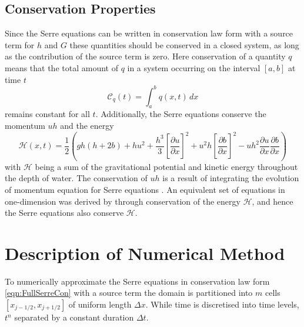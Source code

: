 \documentclass[AMA,STIX1COL]{WileyNJD-v2}
\begin{document}
\subsection{Conservation Properties}
Since the Serre equations can be written in conservation law form with a source term for $h$ and $G$ these quantities should be conserved in a closed system, as long as the contribution of the source term is zero. Here conservation of a quantity $q$ means that the total amount of $q$ in a system occurring on the interval $[a,b]$ at time $t$
\begin{equation*}
\mathcal{C}_q(t) = \int_{a}^{b} q(x,t)\, dx
\end{equation*}
remains constant for all $t$. Additionally, the Serre equations conserve the momentum $uh$ and the energy
\begin{equation*}
\mathcal{H}(x,t) = \frac{1}{2} \left( gh\left(h + 2b\right) + hu^2  + \frac{h^3}{3} \left[\frac{\partial u}{\partial x}\right]^2 + u^2h\left[\frac{\partial b}{\partial x}\right]^2 - uh^2 \frac{\partial u}{\partial x} \frac{\partial b}{\partial x}  \right)
\label{eqn:Hamildef}
\end{equation*}
with $\mathcal{H}$ being a sum of the gravitational potential and kinetic energy throughout the depth of water.
The conservation of $uh$ is a result of integrating the evolution of momentum equation for Serre equations \cite{Zoppou-etal-2017}. An equivalent set of equations in one-dimension was derived by \citet{Green-Naghdi-1976-237} through conservation of the energy $\mathcal{H}$, and hence the Serre equations also conserve $\mathcal{H}$. 

\section{Description of Numerical Method}
To numerically approximate the Serre equations in conservation law form \eqref{eqn:FullSerreCon} with a source term the domain is partitioned into $m$ cells $\left[x_{j-1/2},x_{j+1/2}\right]$ of uniform length $\Delta x$. While time is discretised into time levels, $t^n$ separated by a constant duration $\Delta t$.
\end{document}
